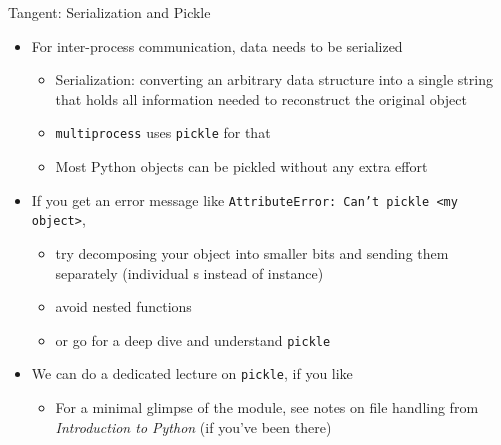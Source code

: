 \begin{frame}[fragile]{Tangent: Serialization and Pickle}
%
\begin{itemize}
\item For inter-process communication, data needs to be serialized
	\begin{itemize}
	\item Serialization: converting an arbitrary data structure into a single string that holds all information needed to reconstruct the original object
	\item \texttt{multiprocess} uses \texttt{pickle} for that
	\item Most Python objects can be pickled without any extra effort
	\end{itemize}
\item If you get an error message like \texttt{AttributeError: Can't pickle <my object>},
	\begin{itemize}
	\item try decomposing your object into smaller bits and sending them separately (\zB individual s instead of  instance)
	\item avoid nested functions
	\item or go for a deep dive and understand \texttt{pickle}
	\end{itemize}
\item We can do a dedicated lecture on \texttt{pickle}, if you like
	\begin{itemize}
	\item For a minimal glimpse of the module, see notes on file handling from \emph{Introduction to Python} (if you've been there)
	\end{itemize}
\end{itemize}
%
\end{frame}


